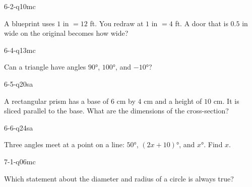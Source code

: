\begin{practiceQuestion}{6-2-q10}{mc}
\begin{questionText}
A blueprint uses $1$ in $= 12$ ft. You redraw at $1$ in $= 4$ ft. A door that is $0.5$ in wide on the original becomes how wide?
\end{questionText}
\end{practiceQuestion}

\begin{practiceQuestion}{6-4-q13}{mc}
\begin{questionText}
Can a triangle have angles $90°$, $100°$, and $-10°$?
\end{questionText}
\end{practiceQuestion}

\begin{practiceQuestion}{6-5-q20}{sa}
\begin{questionText}
A rectangular prism has a base of $6$ cm by $4$ cm and a height of $10$ cm. It is sliced parallel to the base. What are the dimensions of the cross-section?
\end{questionText}
\end{practiceQuestion}

\begin{practiceQuestion}{6-6-q24}{sa}
\begin{questionText}
Three angles meet at a point on a line: $50°$, $(2x + 10)°$, and $x°$. Find $x$.
\end{questionText}
\end{practiceQuestion}

\begin{practiceQuestion}{7-1-q06}{mc}
\begin{questionText}
Which statement about the diameter and radius of a circle is always true?
\end{questionText}
\end{practiceQuestion}

